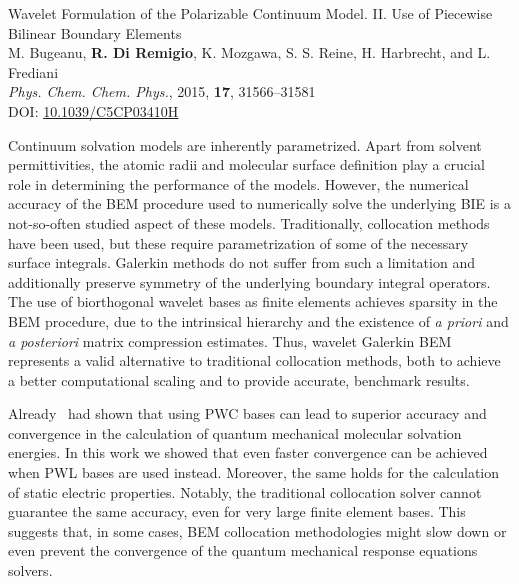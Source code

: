 \begin{tcolorbox}
  {\small
  \textsf{Wavelet Formulation of the Polarizable Continuum Model. II. Use of
  Piecewise Bilinear Boundary Elements
  }
  \\
  M. Bugeanu, \textbf{R. Di Remigio}, K. Mozgawa, S. S. Reine, H.
  Harbrecht,  and L. Frediani
  \\
  \textit{Phys. Chem. Chem. Phys.}, \textrm{2015}, \textbf{17},
  31566--31581
  \\
  DOI: \url{10.1039/C5CP03410H}
  }
\end{tcolorbox}

Continuum solvation models are inherently parametrized. Apart from solvent permittivities,
the atomic radii and molecular surface definition play a crucial role
in determining the performance of the models.
However, the numerical accuracy of the \acrshort{BEM} procedure used to numerically solve the
underlying \acrshort{BIE} is a not-so-often studied aspect of these models.
Traditionally, collocation methods have been used, but these require parametrization of some of the necessary surface integrals.
Galerkin methods do not suffer from such a limitation and additionally preserve symmetry of the underlying
boundary integral operators.
The use of biorthogonal wavelet bases as finite elements achieves sparsity in
the \acrshort{BEM} procedure, due to the intrinsical hierarchy and
the existence of \emph{a priori} and \emph{a posteriori} matrix compression
estimates.
Thus, wavelet Galerkin \acrshort{BEM} represents a valid alternative to traditional
collocation methods, both to achieve a better computational scaling and to
provide accurate, benchmark results.\autocite{Harbrecht2004-uo,
Harbrecht2006-ug, Dahmen2006-pj}

Already~\citeauthor{Weijo2010-hy} had shown that using \gls{PWC} bases can lead
to superior accuracy and convergence in the calculation of quantum mechanical
molecular solvation energies.
In this work we showed that even faster convergence can be achieved when
\gls{PWL} bases are used instead.
Moreover, the same holds for the calculation of static electric properties.
Notably, the traditional collocation solver cannot guarantee the same accuracy,
even for very large finite element bases. This suggests that, in some cases,
\acrshort{BEM} collocation methodologies might slow down or even prevent the
convergence of the quantum mechanical response equations solvers.

